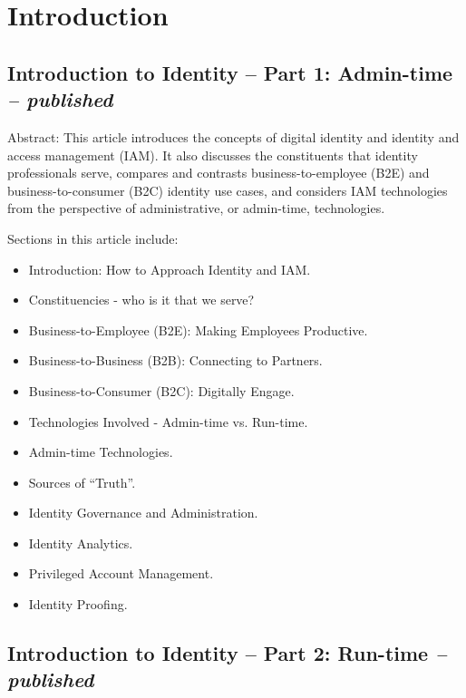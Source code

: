 \hypertarget{introduction}{%
\chapter{Introduction}\label{introduction}}

\hypertarget{introduction-to-identity-part-1-admin-time-published}{%
\section{\texorpdfstring{Introduction to Identity -- Part 1:
Admin-time \emph{--
published}}{Introduction to Identity -- Part 1: Admin-time -- published}}\label{introduction-to-identity-part-1-admin-time-published}}

Abstract: This article introduces the concepts of digital identity and
identity and access management (IAM). It also discusses the constituents
that identity professionals serve, compares and contrasts
business-to-employee (B2E) and business-to-consumer (B2C) identity use
cases, and considers IAM technologies from the perspective of
administrative, or admin-time, technologies.

Sections in this article include:

\begin{itemize}
\item
  Introduction: How to Approach Identity and IAM.
\item
  Constituencies - who is it that we serve?
\item
  Business-to-Employee (B2E): Making Employees Productive.
\item
  Business-to-Business (B2B): Connecting to Partners.
\item
  Business-to-Consumer (B2C): Digitally Engage.
\item
  Technologies Involved - Admin-time vs. Run-time.
\item
  Admin-time Technologies.
\item
  Sources of ``Truth''.
\item
  Identity Governance and Administration.
\item
  Identity Analytics.
\item
  Privileged Account Management.
\item
  Identity Proofing.
\end{itemize}

\hypertarget{introduction-to-identity-part-2-run-time-published}{%
\section{\texorpdfstring{Introduction to Identity -- Part 2: Run-time
\emph{--
published}}{Introduction to Identity -- Part 2: Run-time -- published}}\label{introduction-to-identity-part-2-run-time-published}}

